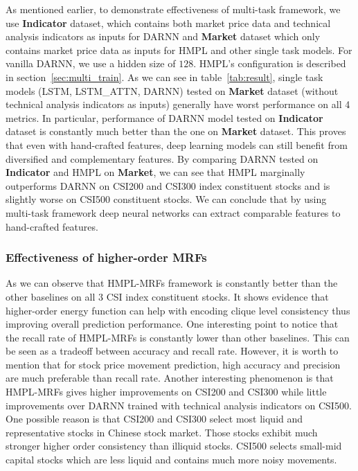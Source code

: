 \documentclass[sigconf, anonymous, review]{acmart}
\begin{document}
As mentioned earlier, to demonstrate effectiveness of multi-task
framework, we use \textbf{Indicator} dataset, which contains both
market price data and technical analysis indicators as inputs for
DARNN and \textbf{Market} dataset which only contains market
price data as inputs for HMPL and other single task models. For
vanilla DARNN, we use a hidden size of $128$. HMPL's
configuration is described in section~\ref{sec:multi_train}. As
we can see in table~\ref{tab:result}, single task models (LSTM,
LSTM\_ATTN, DARNN) tested on \textbf{Market} dataset (without
technical analysis indicators as inputs) generally have worst
performance on all 4 metrics. In particular, performance of DARNN
model tested on \textbf{Indicator} dataset is constantly much
better than the one on \textbf{Market} dataset. This proves that
even with hand-crafted features, deep learning models can still
benefit from diversified and complementary features. By comparing
DARNN tested on \textbf{Indicator} and HMPL on \textbf{Market},
we can see that HMPL marginally outperforms DARNN on CSI200 and
CSI300 index constituent stocks and is slightly worse on CSI500
constituent stocks. We can conclude that by using multi-task
framework deep neural networks can extract comparable features to
hand-crafted features.

\subsubsection{Effectiveness of higher-order MRFs}

As we can observe that HMPL-MRFs framework is constantly better
than the other baselines on all 3 CSI index constituent stocks.
It shows evidence that higher-order energy function can help with
encoding clique level consistency thus improving overall
prediction performance. One interesting point to notice that the
recall rate of HMPL-MRFs is constantly lower than other
baselines. This can be seen as a tradeoff between accuracy and
recall rate. However, it is worth to mention that for stock price
movement prediction, high accuracy and precision are much
preferable than recall rate. Another interesting phenomenon is
that HMPL-MRFs gives higher improvements on CSI200 and CSI300
while little improvements over DARNN trained with technical
analysis indicators on CSI500. One possible reason is that CSI200
and CSI300 select most liquid and representative stocks in
Chinese stock market. Those stocks exhibit much stronger higher
order consistency than illiquid stocks. CSI500 selects small-mid
capital stocks which are less liquid and contains much more noisy
movements.
\end{document}
